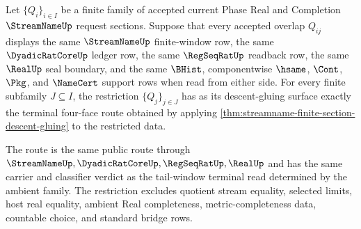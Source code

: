\begin{theorem}
\label{thm:streamname-finite-section-restriction-exactness}
Let $\{Q_i\}_{i \in I}$ be a finite family of accepted current Phase Real and
Completion $\StreamNameUp$ request sections. Suppose that every accepted overlap
$Q_{ij}$ displays the same $\StreamNameUp$ finite-window row, the same
$\DyadicRatCoreUp$ ledger row, the same $\RegSeqRatUp$ readback row, the same
$\RealUp$ seal boundary, and the same $\BHist$, componentwise $\hsame$, $\Cont$,
$\Pkg$, and $\NameCert$ support rows when read from either side. For every
finite subfamily $J \subseteq I$, the restriction $\{Q_j\}_{j \in J}$ has as its
descent-gluing surface exactly the terminal four-face route obtained by applying
\autoref{thm:streamname-finite-section-descent-gluing} to the restricted data.

The route is the same public route through
$\StreamNameUp,\DyadicRatCoreUp,\RegSeqRatUp,\RealUp$ and has the same carrier
and classifier verdict as the tail-window terminal read determined by the
ambient family. The restriction excludes quotient stream equality, selected
limits, host real equality, ambient Real completeness, metric-completeness data,
countable choice, and standard bridge rows.
\end{theorem}
